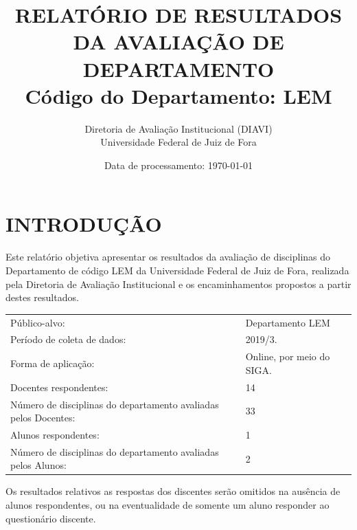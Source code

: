 \documentclass[a4paper,10pt]{article}
\date{Data de processamento: \today}
\begin{document}
\author{Diretoria de Avaliação Institucional (DIAVI) \\ Universidade Federal de Juiz de Fora}

\title{RELATÓRIO DE RESULTADOS DA AVALIAÇÃO DE DEPARTAMENTO\\ Código do Departamento: LEM}
\maketitle
\section{INTRODUÇÃO}
Este relatório objetiva apresentar os resultados da avaliação de disciplinas do Departamento     de código LEM da Universidade Federal de Juiz de Fora, realizada pela     Diretoria de Avaliação Institucional e os encaminhamentos propostos a     partir destes resultados.

\begin{center}
\begin{tabularx}{\linewidth}{X|l}

Público-alvo:& Departamento  LEM\\

Período de coleta de dados:& 2019/3.\\

Forma de aplicação:& Online, por meio do SIGA.\\

Docentes respondentes:& 14\\

Número de disciplinas do departamento avaliadas pelos Docentes:& 33\\

Alunos   respondentes:& 1\\

Número de disciplinas do departamento  avaliadas pelos   Alunos:& 2\\
\end{tabularx}
\end{center}

Os resultados relativos as respostas dos discentes serão omitidos na ausência de alunos respondentes, ou na eventualidade de somente um aluno responder ao questionário discente.
\end{document}
